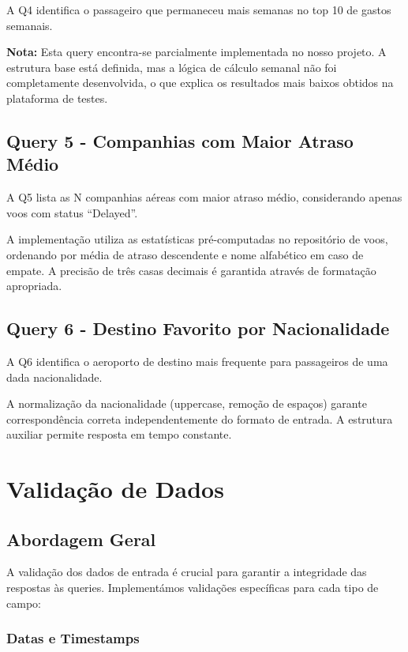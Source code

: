 \documentclass[a4paper,12pt]{scrreprt}
\begin{document}
A Q4 identifica o passageiro que permaneceu mais semanas no top 10 de gastos semanais.

\textbf{Nota:} Esta query encontra-se parcialmente implementada no nosso projeto. A estrutura base está definida, mas a lógica de cálculo semanal não foi completamente desenvolvida, o que explica os resultados mais baixos obtidos na plataforma de testes.

\section{Query 5 - Companhias com Maior Atraso Médio}

A Q5 lista as N companhias aéreas com maior atraso médio, considerando apenas voos com status ``Delayed''.

A implementação utiliza as estatísticas pré-computadas no repositório de voos, ordenando por média de atraso descendente e nome alfabético em caso de empate. A precisão de três casas decimais é garantida através de formatação apropriada.

\section{Query 6 - Destino Favorito por Nacionalidade}

A Q6 identifica o aeroporto de destino mais frequente para passageiros de uma dada nacionalidade.

A normalização da nacionalidade (uppercase, remoção de espaços) garante correspondência correta independentemente do formato de entrada. A estrutura auxiliar permite resposta em tempo constante.

\chapter{Validação de Dados}

\section{Abordagem Geral}

A validação dos dados de entrada é crucial para garantir a integridade das respostas às queries. Implementámos validações específicas para cada tipo de campo:

\subsection{Datas e Timestamps}
\end{document}
